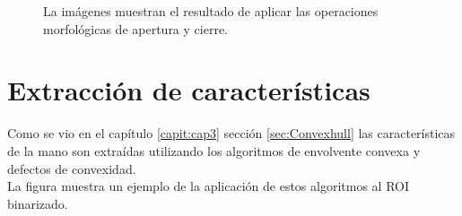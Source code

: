 \begin{figure}[h!]
\begin{center} 
   \qquad
{}  
\end{center}
\caption{La imágenes muestran el resultado de aplicar las operaciones morfológicas de apertura y cierre.}
\label{fig:HandNoNoises}
\end{figure}  


\section{Extracción de características}\label{sec:ExtraccionCaracteristicasSystem}

Como se vio en el capítulo \ref{capit:cap3} sección \ref{sec:Convexhull} las características de la mano son extraídas utilizando los algoritmos de envolvente convexa y  defectos de convexidad.\\
La figura muestra un ejemplo de la aplicación de estos algoritmos al ROI binarizado.  

